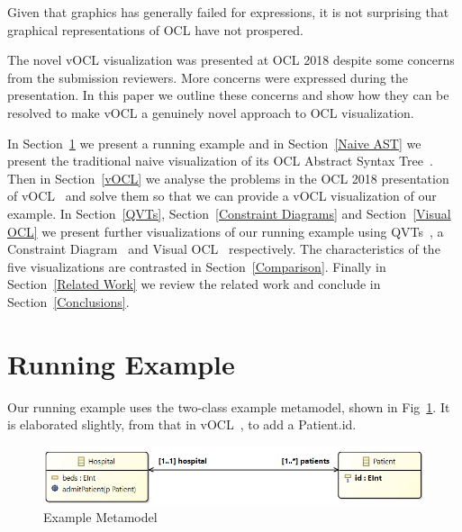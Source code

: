 \documentclass{llncs}
\begin{document}
Given that graphics has generally failed for expressions, it is not surprising that graphical representations of OCL have not prospered.

The novel vOCL visualization was presented at OCL 2018 despite some concerns from the submission reviewers. More concerns were expressed during the presentation. In this paper we outline these concerns and show how they can be resolved to make vOCL a genuinely novel approach to OCL visualization.

In Section~\ref{Running Example} we present a running example and in Section~\ref{Naive AST} we present the traditional naive visualization of its OCL Abstract Syntax Tree~\cite{DragonBook}. Then in Section~\ref{vOCL} we analyse the problems in the OCL 2018 presentation of vOCL~\cite{vOCL} and solve them so that we can provide a vOCL visualization of our example. In Section~\ref{QVTs}, Section~\ref{Constraint Diagrams} and Section~\ref{Visual OCL} we present further visualizations of our running example using QVTs~\cite{QVTs}, a Constraint Diagram~\cite{Constraint-Diagrams} and Visual OCL~\cite{Visual-OCL} respectively. The characteristics of the five visualizations are contrasted in Section~\ref{Comparison}. Finally in Section~\ref{Related Work} we review the related work and conclude in Section~\ref{Conclusions}.
 
\section{Running Example}\label{Running Example}

Our running example uses the two-class example metamodel, shown in Fig~\ref{fig:ExampleMetamodel}. It is elaborated slightly, from that in vOCL~\cite{vOCL}, to add a Patient.id.

\begin{figure}
	\vspace{-10pt}
	\begin{center}
		\includegraphics[width=4.5in]{Metamodel.png}
	\end{center}
	\vspace{-10pt}
	\caption{Example Metamodel}
	\label{fig:ExampleMetamodel}
	\vspace{-10pt}
\end{figure}
\end{document}
